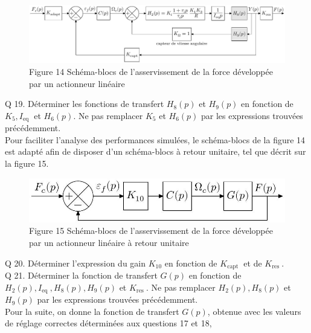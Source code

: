 \documentclass[10pt]{article}
\begin{document}
\begin{figure}[h]
\begin{center}
  \includegraphics[width=\textwidth]{2025_09_16_5f2d7643f7e649c6833dg-11(1)}
\captionsetup{labelformat=empty}
\caption{Figure 14 Schéma-blocs de l'asservissement de la force développée par un actionneur linéaire}
\end{center}
\end{figure}

Q 19. Déterminer les fonctions de transfert $H_{8}(p)$ et $H_{9}(p)$ en fonction de $K_{5}, I_{\text {eq }}$ et $H_{6}(p)$. Ne pas remplacer $K_{5}$ et $H_{6}(p)$ par les expressions trouvées précédemment.\\
Pour faciliter l'analyse des performances simulées, le schéma-blocs de la figure 14 est adapté afin de disposer d'un schéma-blocs à retour unitaire, tel que décrit sur la figure 15.

\begin{figure}[h]
\begin{center}
  \includegraphics[width=\textwidth]{2025_09_16_5f2d7643f7e649c6833dg-11}
\captionsetup{labelformat=empty}
\caption{Figure 15 Schéma-blocs de l'asservissement de la force développée par un actionneur linéaire à retour unitaire}
\end{center}
\end{figure}

Q 20. Déterminer l'expression du gain $K_{10}$ en fonction de $K_{\text {capt }}$ et de $K_{\text {res }}$.\\
Q 21. Déterminer la fonction de transfert $G(p)$ en fonction de $H_{2}(p), I_{\text {eq }}, H_{8}(p), H_{9}(p)$ et $K_{\text {res }}$. Ne pas remplacer $H_{2}(p), H_{8}(p)$ et $H_{9}(p)$ par les expressions trouvées précédemment.\\
Pour la suite, on donne la fonction de transfert $G(p)$, obtenue avec les valeurs de réglage correctes déterminées aux questions 17 et 18,
\end{document}
